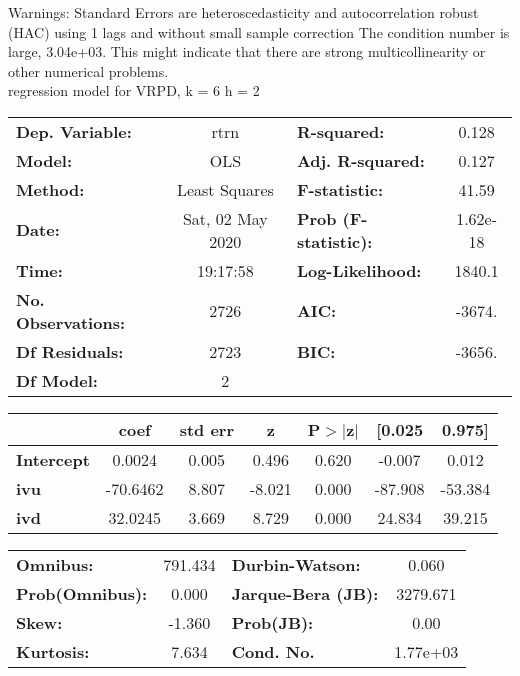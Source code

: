Warnings: \newline
 [1] Standard Errors are heteroscedasticity and autocorrelation robust (HAC) using 1 lags and without small sample correction \newline
 [2] The condition number is large, 3.04e+03. This might indicate that there are \newline
 strong multicollinearity or other numerical problems.\\ 

regression model for VRPD, k = 6 h = 2\begin{center}
\begin{tabular}{lclc}
\toprule
\textbf{Dep. Variable:}    &       rtrn       & \textbf{  R-squared:         } &     0.128   \\
\textbf{Model:}            &       OLS        & \textbf{  Adj. R-squared:    } &     0.127   \\
\textbf{Method:}           &  Least Squares   & \textbf{  F-statistic:       } &     41.59   \\
\textbf{Date:}             & Sat, 02 May 2020 & \textbf{  Prob (F-statistic):} &  1.62e-18   \\
\textbf{Time:}             &     19:17:58     & \textbf{  Log-Likelihood:    } &    1840.1   \\
\textbf{No. Observations:} &        2726      & \textbf{  AIC:               } &    -3674.   \\
\textbf{Df Residuals:}     &        2723      & \textbf{  BIC:               } &    -3656.   \\
\textbf{Df Model:}         &           2      & \textbf{                     } &             \\
\bottomrule
\end{tabular}
\begin{tabular}{lcccccc}
                   & \textbf{coef} & \textbf{std err} & \textbf{z} & \textbf{P$> |$z$|$} & \textbf{[0.025} & \textbf{0.975]}  \\
\midrule
\textbf{Intercept} &       0.0024  &        0.005     &     0.496  &         0.620        &       -0.007    &        0.012     \\
\textbf{ivu}       &     -70.6462  &        8.807     &    -8.021  &         0.000        &      -87.908    &      -53.384     \\
\textbf{ivd}       &      32.0245  &        3.669     &     8.729  &         0.000        &       24.834    &       39.215     \\
\bottomrule
\end{tabular}
\begin{tabular}{lclc}
\textbf{Omnibus:}       & 791.434 & \textbf{  Durbin-Watson:     } &    0.060  \\
\textbf{Prob(Omnibus):} &   0.000 & \textbf{  Jarque-Bera (JB):  } & 3279.671  \\
\textbf{Skew:}          &  -1.360 & \textbf{  Prob(JB):          } &     0.00  \\
\textbf{Kurtosis:}      &   7.634 & \textbf{  Cond. No.          } & 1.77e+03  \\
\bottomrule
\end{tabular}
\end{center}

